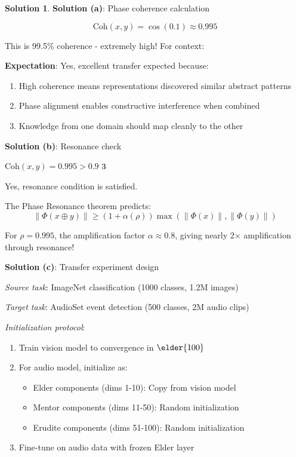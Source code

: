 \documentclass[12pt,a4paper]{article}
\newcommand{\degree}{$^\circ$}
\newcommand{\checkmark}{\ding{51}}
\theoremstyle{definition}
\newtheorem{solution}{Solution}[section]
\theoremstyle{remark}
\begin{document}
\begin{solution}
\textbf{Solution (a)}: Phase coherence calculation

$$\text{Coh}(x,y) = \cos(0.1) \approx 0.995$$

This is 99.5\% coherence - extremely high! For context:

\textbf{Expectation}: Yes, excellent transfer expected because:
\begin{enumerate}
\item High coherence means representations discovered similar abstract patterns
\item Phase alignment enables constructive interference when combined
\item Knowledge from one domain should map cleanly to the other
\end{enumerate}

\textbf{Solution (b)}: Resonance check

$\text{Coh}(x,y) = 0.995 > 0.9$ $\checkmark$ 

Yes, resonance condition is satisfied.

The Phase Resonance theorem predicts:
$$\|\Phi(x \oplus y)\| \geq (1 + \alpha(\rho)) \max(\|\Phi(x)\|, \|\Phi(y)\|)$$

For $\rho = 0.995$, the amplification factor $\alpha \approx 0.8$, giving nearly 2× amplification through resonance!

\textbf{Solution (c)}: Transfer experiment design

\textit{Source task}: ImageNet classification (1000 classes, 1.2M images)

\textit{Target task}: AudioSet event detection (500 classes, 2M audio clips)

\textit{Initialization protocol}:
\begin{enumerate}
\item Train vision model to convergence in $\elder{100}$
\item For audio model, initialize as:
\begin{itemize}
\item Elder components (dims 1-10): Copy from vision model
\item Mentor components (dims 11-50): Random initialization
\item Erudite components (dims 51-100): Random initialization
\end{itemize}
\item Fine-tune on audio data with frozen Elder layer
\end{enumerate}


\end{solution}
\end{document}
